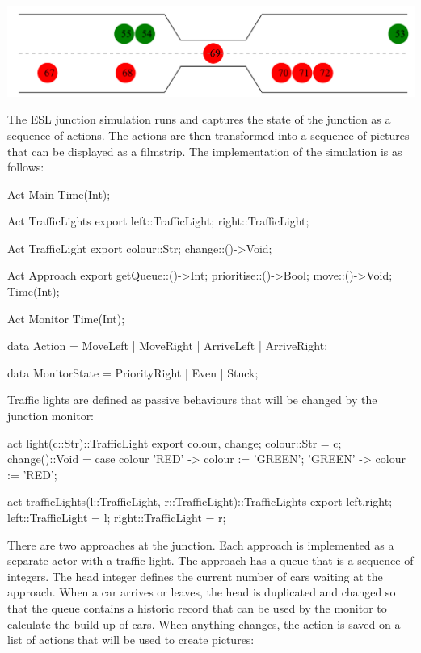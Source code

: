 \documentclass[5p,times]{elsarticle}
\begin{document}
\begin{center}
\includegraphics[width=\columnwidth]{traffic}
\end{center}
The ESL junction simulation runs and captures the state of the junction as a sequence of actions. The actions are then transformed into a sequence of pictures that can be displayed as a filmstrip. The implementation of the simulation is as follows:
\begin{ESL}
Act Main { Time(Int); }

Act TrafficLights { 
  export left::TrafficLight; right::TrafficLight; 
}

Act TrafficLight { 
  export colour::Str; change::()->Void; 
}

Act Approach { 
  export getQueue::()->Int; prioritise::()->Bool; 
         move::()->Void; Time(Int); 
}

Act Monitor { Time(Int); }

data Action = 
   MoveLeft
|  MoveRight
|  ArriveLeft
|  ArriveRight;

data MonitorState = PriorityRight | Even | Stuck;
\end{ESL}
Traffic lights are defined as passive behaviours that will be changed by the junction monitor:
\begin{ESL}
act light(c::Str)::TrafficLight {
  export colour, change;
  colour::Str = c;
  change()::Void =
    case colour {
      'RED' -> colour := 'GREEN';
      'GREEN' -> colour := 'RED';
    }
}

act trafficLights(l::TrafficLight,
                  r::TrafficLight)::TrafficLights {
  export left,right;
  left::TrafficLight = l;
  right::TrafficLight = r;
}
\end{ESL}
There are two approaches at the junction. Each approach is implemented as a separate actor with a traffic light. The approach has a queue that is a sequence of integers. The head integer defines the current number of cars waiting at the approach. When a car arrives or leaves, the head is duplicated and changed so that the queue contains a historic record that can be used by the monitor to calculate the build-up of cars. When anything changes, the action is saved on a list of actions that will be used to create pictures:
\end{document}
